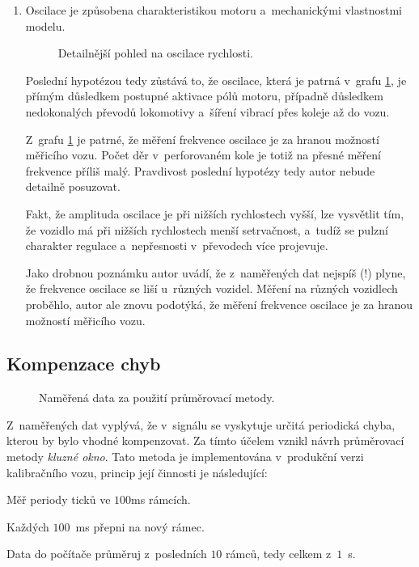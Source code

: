 \begin{enumerate}
\item Oscilace je způsobena charakteristikou motoru a~mechanickými vlastnostmi
modelu.

\begin{figure}[ht]

\caption{Detailnější pohled na oscilace rychlosti.}
\label{fig:speed-presny}
\end{figure}

Poslední hypotézou tedy zůstává to, že oscilace, která je patrná v~grafu
\ref{fig:speed-presny}, je přímým důsledkem postupné aktivace pólů motoru,
případně důsledkem nedokonalých převodů lokomotivy a~šíření vibrací přes koleje
až do vozu.

Z~grafu \ref{fig:speed-presny} je patrné, že měření frekvence oscilace je za
hranou možností měřicího vozu. Počet děr v~perforovaném kole je totiž na přesné
měření frekvence příliš malý. Pravdivost poslední hypotézy tedy autor nebude
detailně posuzovat.

Fakt, že amplituda oscilace je při nižších rychlostech vyšší, lze vysvětlit
tím, že vozidlo má při nižších rychlostech menší setrvačnost, a~tudíž se pulzní
charakter regulace a~nepřesnosti v~převodech více projevuje.

Jako drobnou poznámku autor uvádí, že z~naměřených dat nejspíš (!) plyne,
že frekvence oscilace se liší u~různých vozidel. Měření na různých vozidlech
proběhlo, autor ale znovu podotýká, že měření frekvence oscilace je za hranou
možností měřicího vozu.

\end{enumerate}

\subsection{Kompenzace chyb}
\label{subsec:wsm-kompenzace}

\begin{figure}[ht]

\caption{Naměřená data za použití průměrovací metody.}
\label{fig:prumer}
\end{figure}

Z~naměřených dat vyplývá, že v~signálu se vyskytuje určitá periodická chyba,
kterou by bylo vhodné kompenzovat. Za tímto účelem vznikl návrh průměrovací
metody \textit{kluzné okno}. Tato metoda je implementována v~produkční verzi
kalibračního vozu, princip její činnosti je následující:

\begin{compactenum}
\item Měř periody ticků ve $100$ms rámcích.
\item Každých $100$~ms přepni na nový rámec.
\item Data do počítače průměruj z~posledních $10$ rámců, tedy celkem z~$1$~s.
\end{compactenum}

